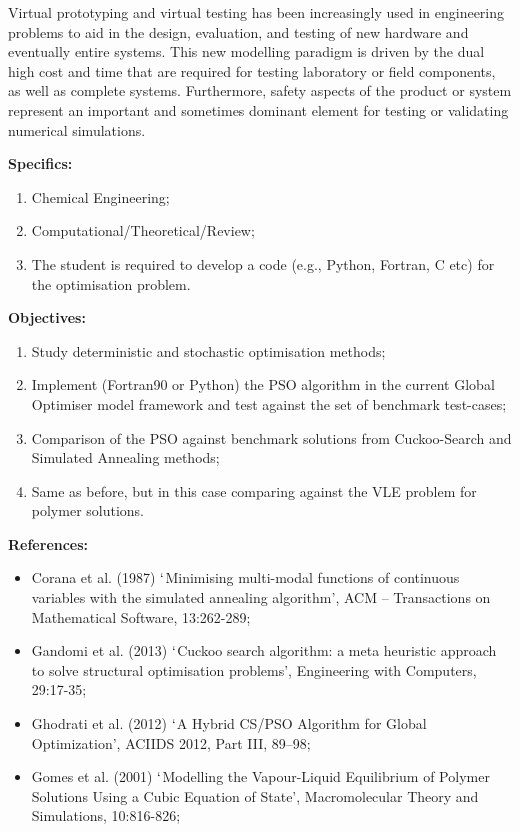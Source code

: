 \documentclass[12pts,a4paper,amsmath,amssymb,floatfix]{article}%
\begin{document}
\begin{enumerate}[label=\bfseries Project \arabic*:]
Virtual prototyping and virtual testing has been increasingly used in engineering problems to aid in the design, evaluation, and testing of new hardware and eventually entire systems. This new modelling paradigm is driven by the dual high cost and time that are required for testing laboratory or field components, as well as complete systems. Furthermore, safety aspects of the product or system represent an important and sometimes dominant element for testing or validating numerical simulations.


\noindent
{\bf Specifics:} 
\begin{enumerate}
\item Chemical Engineering;
\item Computational/Theoretical/Review;
\item The student is required to develop a code (e.g., Python, Fortran, C etc) for the optimisation problem.
\end{enumerate} 



\noindent
{\bf Objectives:}
\begin{enumerate}
\item Study deterministic and stochastic optimisation methods;
\item Implement (Fortran90 or Python) the PSO algorithm in the current Global Optimiser model framework and test against the set of benchmark test-cases;
\item Comparison of the PSO against benchmark solutions from Cuckoo-Search and Simulated Annealing methods;
\item Same as before, but in this case comparing against the VLE problem for polymer solutions.  
\end{enumerate}


\noindent
{\bf References:}
\begin{itemize}
\item Corana et al. (1987) $\lq$Minimising multi-modal functions of continuous variables with the simulated annealing algorithm', ACM -- Transactions on Mathematical Software, 13:262-289;
\item Gandomi et al. (2013) $\lq$Cuckoo search algorithm: a meta heuristic approach to solve structural optimisation problems', Engineering with Computers, 29:17-35;
\item Ghodrati et al. (2012) $\lq$A Hybrid CS/PSO Algorithm for Global Optimization', ACIIDS 2012, Part III, 89–98;
\item Gomes et al. (2001) $\lq$Modelling the Vapour-Liquid Equilibrium of Polymer Solutions Using a Cubic Equation of State', Macromolecular Theory and Simulations, 10:816-826;
\end{itemize}


\end{enumerate}
\end{document}
